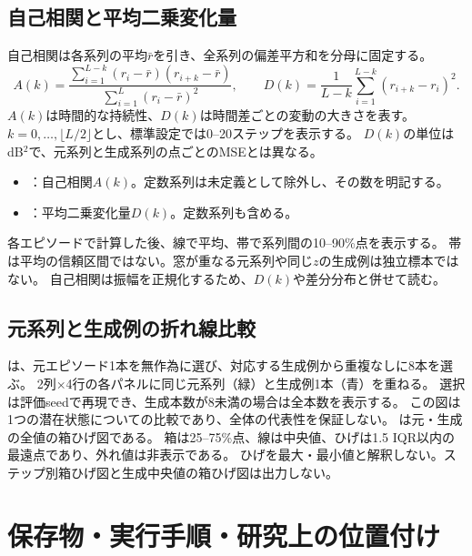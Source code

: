 \documentclass[a4paper,10pt]{article}
\begin{document}
\subsection{自己相関と平均二乗変化量}
自己相関は各系列の平均$\bar r$を引き、全系列の偏差平方和を分母に固定する。
\[
 A(k)=\frac{\sum_{i=1}^{L-k}(r_i-\bar r)(r_{i+k}-\bar r)}
 {\sum_{i=1}^{L}(r_i-\bar r)^2},\qquad
 D(k)=\frac1{L-k}\sum_{i=1}^{L-k}(r_{i+k}-r_i)^2.
\]
$A(k)$は時間的な持続性、$D(k)$は時間差ごとの変動の大きさを表す。
$k=0,\ldots,\lfloor L/2\rfloor$とし、標準設定では0--20ステップを表示する。
$D(k)$の単位はdB$^2$で、元系列と生成系列の点ごとのMSEとは異なる。
\begin{itemize}
\item {}：自己相関$A(k)$。定数系列は未定義として除外し、その数を明記する。
\item {}：平均二乗変化量$D(k)$。定数系列も含める。
\end{itemize}
各エピソードで計算した後、線で平均、帯で系列間の10--90\%点を表示する。
帯は平均の信頼区間ではない。窓が重なる元系列や同じ$z$の生成例は独立標本ではない。
自己相関は振幅を正規化するため、$D(k)$や差分分布と併せて読む。

\subsection{元系列と生成例の折れ線比較}
は、元エピソード1本を無作為に選び、対応する生成例から重複なしに8本を選ぶ。
2列$\times$4行の各パネルに同じ元系列（緑）と生成例1本（青）を重ねる。
選択は評価seedで再現でき、生成本数が8未満の場合は全本数を表示する。
この図は1つの潜在状態についての比較であり、全体の代表性を保証しない。
は元・生成の全値の箱ひげ図である。
箱は25--75\%点、線は中央値、ひげは1.5 IQR以内の最遠点であり、外れ値は非表示である。
ひげを最大・最小値と解釈しない。ステップ別箱ひげ図と生成中央値の箱ひげ図は出力しない。

\newpage
\section{保存物・実行手順・研究上の位置付け}
\end{document}
